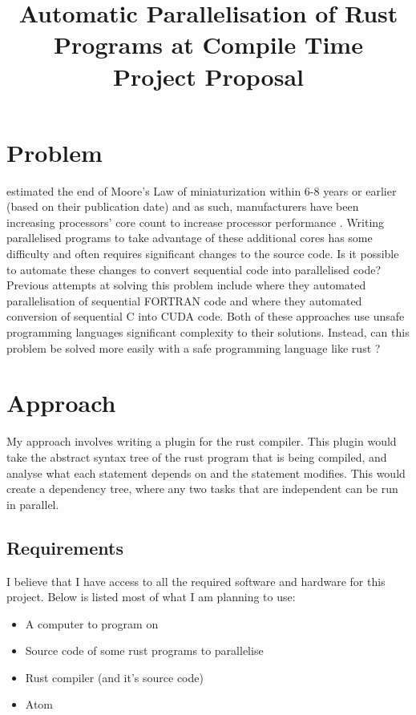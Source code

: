 \documentclass[12pt, a4paper]{article}
\title{
	\vspace{-4ex}
	\LARGE\textbf{Automatic Parallelisation of Rust Programs at Compile Time} \\
	\vspace{1ex}
	\large\textbf{Project Proposal}
	\vspace{-9ex}
}
\date{}
\begin{document}
\maketitle

\section{Problem}
\textcite{kish2002end} estimated the end of Moore's Law of miniaturization within 6-8 years or earlier (based on their publication date) and as such, manufacturers have been increasing processors' core count to increase processor performance \parencite{geer2005chip}. Writing parallelised programs to take advantage of these additional cores has some difficulty and often requires significant changes to the source code. Is it possible to automate these changes to convert sequential code into parallelised code? Previous attempts at solving this problem include \textcite{d1998fortran} where they automated parallelisation of sequential FORTRAN code and \textcite{baskaran2010automatic} where they automated conversion of sequential C into CUDA code. Both of these approaches use unsafe programming languages significant complexity to their solutions. Instead, can this problem be solved more easily with a safe programming language like rust \parencite{rustlang}?

\section{Approach}
My approach involves writing a plugin for the rust compiler. This plugin would take the abstract syntax tree of the rust program that is being compiled, and analyse what each statement depends on and the statement modifies. This would create a dependency tree, where any two tasks that are independent can be run in parallel.


\subsection{Requirements}
I believe that I have access to all the required software and hardware for this project. Below is listed most of what I am planning to use:
\begin{itemize}
	\item A computer to program on
	\item Source code of some rust programs to parallelise
	\item Rust compiler (and it's source code)
	\item Atom
\end{itemize}
\end{document}
